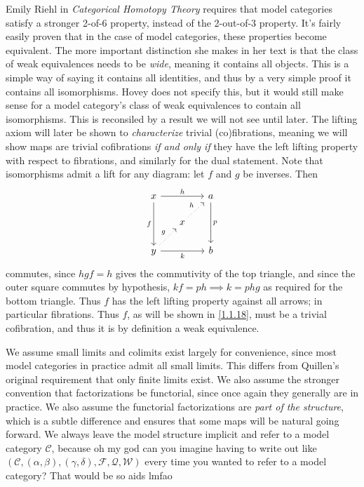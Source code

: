 \begin{remark}\label{1.1.8}
	Emily Riehl in \emph{Categorical Homotopy Theory} requires that model categories satisfy a stronger 2-of-6 property, instead of the 2-out-of-3 property. It's fairly easily proven that in the case of model categories, these properties become equivalent. The more important distinction she makes in her text is that the class of weak equivalences needs to be \emph{wide}, meaning it contains all objects. This is a simple way of saying it contains all identities, and thus by a very simple proof it contains all isomorphisms. Hovey does not specify this, but it would still make sense for a model category's class of weak equivalences to contain all isomorphisms. This is reconsiled by a result we will not see until later. The lifting axiom will later be shown to \emph{characterize} trivial (co)fibrations, meaning we will show maps are trivial cofibrations \emph{if and only if} they have the left lifting property with respect to fibrations, and similarly for the dual statement. Note that isomorphisms admit a lift for any diagram: let $f$ and $g$ be inverses. Then
	\[\begin{tikzcd}[row sep = 1.5em, column sep = 1.5em]
	x\ar[" f "', dd] \ar[" h ", rr]  &  & a\ar[" p ", dd]  \\
	 & x \ar[" h ", dotted, ur]  &  \\
	y \ar[" g ", dotted, ur] \ar[" k "', rr]  &  & b
	\end{tikzcd}\]
	commutes, since $hgf=h$ gives the commutivity of the top triangle, and since the outer square commutes by hypothesis, $kf=ph \implies k=phg$ as required for the bottom triangle. Thus $f$ has the left lifting property against all arrows; in particular fibrations. Thus $f$, as will be shown in \cref{1.1.18}, must be a trivial cofibration, and thus it is by definition a weak equivalence.
\end{remark}

We assume small limits and colimits exist largely for convenience, since most model categories in practice admit all small limits. This differs from Quillen's original requirement that only finite limits exist. We also assume the stronger convention that factorizations be functorial, since once again they generally are in practice. We also assume the functorial factorizations are \emph{part of the structure}, which is a subtle difference and ensures that some maps will be natural going forward. We always leave the model structure implicit and refer to a model category $\mathcal{C} $, because oh my god can you imagine having to write out like $(\mathcal{C} ,(\alpha,\beta),(\gamma,\delta),\mathcal{F} ,\mathcal{Q} ,\mathcal{W} )$ every time you wanted to refer to a model category? That would be so aids lmfao

